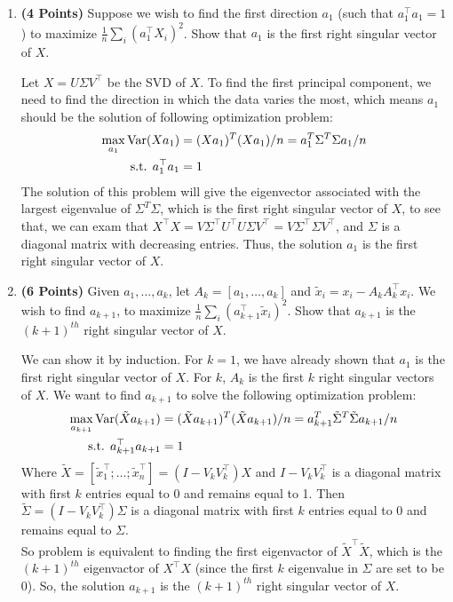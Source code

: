 \begin{enumerate}

\item  \textbf{(4 Points)}
Suppose we wish to find the first direction $a_1$ (such that $a_1^\top a_1 = 1$) to maximize $\frac{1}{n} \sum_i (a_1^\top X_i)^2$.
Show that $a_1$ is the first right singular vector of $X$.

\begin{soln}
Let $X = U\Sigma V^\top$ be the SVD of $X$. To find the first principal component, we need to find the direction in which the data varies the most, which means $a_1$ should be the solution of following optimization problem:
\begin{align*}
  \max_{a_1} \mathrm{Var} (Xa_1) &= (Xa_1)^T(Xa_1)/n = a_1^T \Sigma^T \Sigma a_1/n \\
  \text{s.t. } a_1^\top a_1 &= 1
\end{align*}
The solution of this problem will give the eigenvector associated with the largest eigenvalue of $\Sigma^T \Sigma$, which is the first right singular vector of $X$, to see that, we can exam that $X^\top X = V\Sigma^\top U^\top U\Sigma V^\top = V\Sigma^\top \Sigma V^\top$, and $\Sigma$ is a diagonal matrix with decreasing entries. Thus, the solution $a_1$ is the first right singular vector of $X$.
\end{soln}

\item  \textbf{(6 Points)}
Given $a_1, \dots, a_k$, let $A_k = [a_1, \dots, a_k]$ and 
$\tilde{x}_i = x_i - A_k A_k^\top x_i$. We wish to find $a_{k+1}$, to maximize
$\frac{1}{n} \sum_i (a_{k+1}^\top \tilde{x}_i)^2$. Show that $a_{k+1}$ is the
$(k+1)^{th}$ right singular vector of $X$.

\begin{soln}
  We can show it by induction. For $k=1$, we have already shown that $a_1$ is the first right singular vector of $X$. For $k$, $A_k$ is the first $k$ right singular vectors of $X$. We want to find $a_{k+1}$ to solve the following optimization problem:
  \begin{align*}
    \max_{a_{k+1}} \mathrm{Var} (\tilde{X}a_{k+1}) &= (\tilde{X}a_{k+1})^T(\tilde{X}a_{k+1})/n = a_{k+1}^T \tilde{\Sigma}^T \tilde{\Sigma} a_{k+1}/n \\
    \text{s.t. } a_{k+1}^\top a_{k+1} &= 1
  \end{align*}
  Where $\tilde{X} = [\tilde{x}_1^\top; \dots; \tilde{x}_n^\top] = (I - V_k V_k^\top) X $ and $I - V_k V_k^\top$ is a diagonal matrix with first $k$ entries equal to 0 and remains equal to 1. Then $\tilde{\Sigma} = (I - V_k V_k^\top) \Sigma$ is a diagonal matrix with first $k$ entries equal to 0 and remains equal to $\Sigma$. \\
  So problem is equivalent to finding the first eigenvactor of $\tilde{X}^\top \tilde{X}$, which is the $(k+1)^{th}$ eigenvactor of $X^\top X$ (since the first $k$ eigenvalue in $\Sigma$ are set to be 0). So, the solution $a_{k+1}$ is the $(k+1)^{th}$ right singular vector of $X$.
\end{soln}

\end{enumerate}


